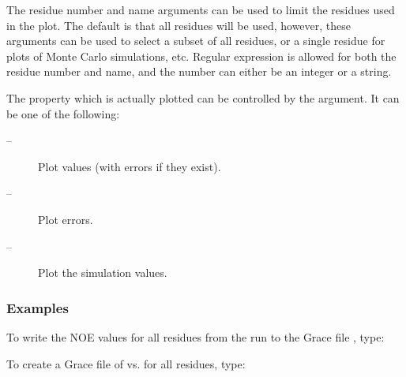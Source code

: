 The residue number and name arguments can be used to limit  the residues used in the plot. 
The default is that all residues will be used, however, these arguments can be used to
select a subset of all residues, or a single residue for plots  of Monte Carlo simulations,
etc.  Regular expression  is allowed for both the residue number and name, and the number can
either be an integer or a string.

The property which is actually plotted  can be controlled by the 
 argument.  It
can be one of the following:
\begin{description}
\item[    
 --]   Plot  values (with errors if they exist).
\item[    
 --]   Plot  errors.
\item[    
 --]    Plot  the simulation values.
\end{description}


\subsubsection{Examples}

To write  the NOE values for all residues from the run 
 to the Grace  file 
,
type:







To create a Grace  file of 
 vs. 
 for all residues, type:



